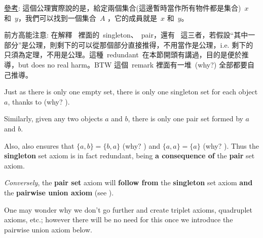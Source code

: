 \begin{note}
\href{https://www.wikiwand.com/en/Axiom_of_pairing#/Consequences}{參考}: 這個公理實際說的是，給定兩個集合(這邊暫時當作所有物件都是集合)\ \(x\) 和\ \(y\)，我們可以找到一個集合\ \(A\) ，它的成員就是\ \(x\) 和\ \(y\)。
\end{note}

\begin{note}
前方高能注意:  在解釋\  裡面的\ singleton、\ pair，還有\  這三者，若假設``其中一部分''是公理，則剩下的可以從那個部分直接推得，不用當作是公理，i.e. 剩下的只須為定理，不用是公理。這種\ redundant\ 在本節開頭有講過，目的是便於推導，but does no real harm。BTW 這個\ remark 裡面有一堆\ (why?) 全部都要自己推導。
\end{note}

\begin{remark} \label{remark 3.1.9}

Just as there is only one empty set, there is only one singleton set for each object \(a\), thanks to  (why? ).

Similarly, given any two objects \(a\) and \(b\), there is only one pair set formed by \(a\) and \(b\).

Also,  also ensures that \( \{a, b\} = \{b, a\} \) (why? ) and \( \{a, a\} = \{a\} \) (why? ). Thus the \textbf{singleton} set axiom is in fact redundant, being \textbf{a consequence of} the \textbf{pair} set axiom.

\emph{Conversely}, the \textbf{pair set} axiom will \textbf{follow from} the \textbf{singleton} set axiom \textbf{and} the \textbf{pairwise union axiom } (see  ).

One may wonder why we don’t go further and create triplet axioms, quadruplet axioms, etc.; however there will be no need for this once we introduce the pairwise union axiom below.
\end{remark}

